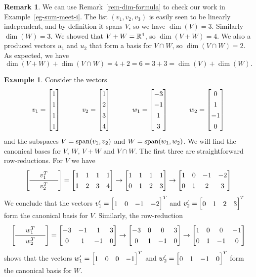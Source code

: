 \documentclass[reqno]{amsart}
\theoremstyle{definition}
\newtheorem{remark}[theorem]{Remark}
\newtheorem{example}[theorem]{Example}
\begin{document}
\begin{remark}
 We can use Remark~\ref{rem-dim-formula} to check our work in
 Example~\ref{eg-sum-meet-i}.  The list $(v_1,v_2,v_3)$ is easily seen
 to be linearly independent, and by definition it spans $V$, so we
 have $\dim(V)=3$.  Similarly $\dim(W)=3$.  We showed that $V+W={\mathbb{R}}^4$,
 so $\dim(V+W)=4$.  We also a produced vectors $u_1$ and $u_2$ that
 form a basis for $V\cap W$, so $\dim(V\cap W)=2$.  As expected, we
 have
 \[ \dim(V+W)+\dim(V\cap W) = 4+2 = 6 = 3+3 = \dim(V)+\dim(W). \]
\end{remark}

\begin{example}\label{eg-sum-meet-iv}
 Consider the vectors
 \[ v_1 = \bbm  1 \\  1 \\  1 \\  1 \ebm \hspace{3em}
    v_2 = \bbm  1 \\  2 \\  3 \\  4 \ebm \hspace{3em}
    w_1 = \bbm -3 \\ -1 \\  1 \\  3 \ebm \hspace{3em}
    w_2 = \bbm  0 \\  1 \\ -1 \\  0 \ebm
 \]
 and the subspaces $V=\operatorname{span}(v_1,v_2)$ and $W=\operatorname{span}(w_1,w_2)$.
 We will find the canonical bases for $V$, $W$, $V+W$ and $V\cap W$.
 The first three are straightforward row-reductions.  For $V$ we have
 \[ {\renewcommand{\arraystretch}{1.3}
  \left[\begin{array}{ccc}
   &v_1^T& \\ \hline &v_2^T&
  \end{array}\right]}
  =
  \bbm
   1 & 1 & 1 & 1 \\
   1 & 2 & 3 & 4
  \ebm
  \to
  \bbm
   1 & 1 & 1 & 1 \\
   0 & 1 & 2 & 3
  \ebm
  \to
  \bbm
   1 & 0 &-1 &-2 \\
   0 & 1 & 2 & 3
  \ebm
 \]
 We conclude that the vectors $v'_1=\bbm 1&0&-1&-2\ebm^T$ and
 $v'_2=\bbm 0&1&2&3\ebm^T$ form the canonical basis for $V$.
 Similarly, the row-reduction
 \[ {\renewcommand{\arraystretch}{1.3}
  \left[\begin{array}{ccc}
   &w_1^T& \\ \hline &w_2^T&
  \end{array}\right]}
  =
  \bbm
   -3&-1 & 1 & 3 \\
   0 & 1 &-1 & 0
  \ebm
  \to
  \bbm
   -3& 0 & 0 & 3 \\
   0 & 1 &-1 & 0
  \ebm
  \to
  \bbm
   1 & 0 & 0 &-1 \\
   0 & 1 &-1 & 0
  \ebm
 \]
 shows that the vectors $w'_1=\bbm 1&0&0&-1\ebm^T$ and
 $w'_2=\bbm 0&1&-1&0\ebm^T$ form the canonical basis for $W$.


\end{example}
\end{document}
